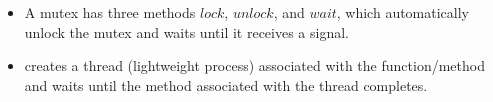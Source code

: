 \begin{itemize}
	
	
	
	
	
	
	\item A mutex has three methods $lock$, $unlock$, and $wait$, which automatically unlock the mutex and waits until it receives a signal.  
	
	
	
	
	
	\item {} creates a thread (lightweight process) associated with the function/method  and  waits until the method associated with the thread  completes.
\end{itemize} 

